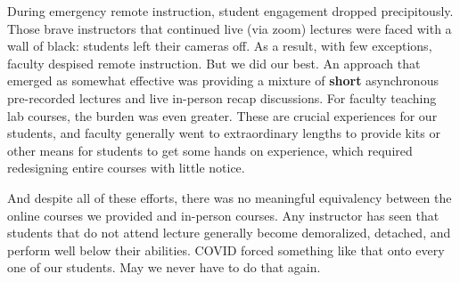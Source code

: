 \documentclass[12pt]{article}
\begin{document}
During emergency remote instruction, student engagement dropped precipitously.  Those brave instructors that continued live (via zoom) lectures were faced with a wall of black: students left their cameras off.  As a result, with few exceptions, faculty despised remote instruction.  But we did our best.  An approach that emerged as somewhat effective was providing a mixture of {\bf short} asynchronous pre-recorded lectures and live in-person recap discussions.  For faculty teaching lab courses, the burden was even greater.  These are crucial experiences for our students, and faculty generally went to extraordinary lengths to provide kits or other means for students to get some hands on experience, which required redesigning entire courses with little notice.  

And despite all of these efforts, there was no meaningful equivalency between the online courses we provided and in-person courses.  Any instructor has seen that students that do not attend lecture generally become demoralized, detached, and perform well below their abilities.  COVID forced something like that onto every one of our students.  May we never have to do that again.
\end{document}
